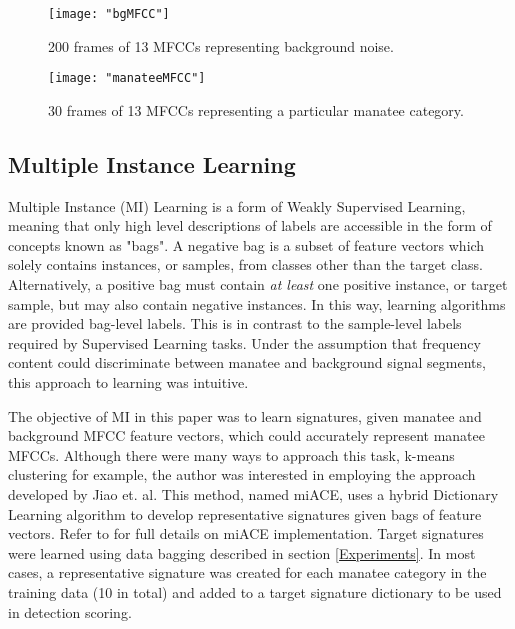 \documentclass[conference]{IEEEtran}
\begin{document}
\begin{center}
	\begin{figure*}[]
		\centering
		\texttt{[image: "bgMFCC"]}
		\caption{200 frames of 13 MFCCs representing background noise.}
		\label{fig:bgMFCC}
	\end{figure*}
\end{center}

\begin{center}
	\begin{figure*}[]
		\centering
		\texttt{[image: "manateeMFCC"]}
		\caption{30 frames of 13 MFCCs representing a particular manatee category.}
		\label{fig:manateeMFCC}
	\end{figure*}
\end{center}
	
	\vspace{-2.5cm}
	\subsection{Multiple Instance Learning}
	Multiple Instance (MI) Learning is a form of Weakly Supervised Learning, meaning that only high level descriptions of labels are accessible in the form of concepts known as "bags".  A negative bag is a subset of feature vectors which solely contains instances, or samples, from classes other than the target class.  Alternatively, a positive bag must contain \textit{at least} one positive instance, or target sample, but may also contain negative instances.    In this way, learning algorithms are provided bag-level labels.  This is in contrast to the sample-level labels required by Supervised Learning tasks.  Under the assumption that frequency content could discriminate between manatee and background signal segments, this approach to learning was intuitive.
	
	The objective of MI in this paper was to learn signatures, given manatee and background MFCC feature vectors, which could accurately represent manatee MFCCs.   Although there were many ways to approach this task, k-means clustering for example, the author was interested in employing the approach developed by Jiao et. al.  This method, named miACE, uses a hybrid Dictionary Learning algorithm to develop representative signatures given bags of feature vectors.  Refer to \cite{miACE} for full details on miACE implementation.  Target signatures were learned using data bagging described in section \ref{Experiments}.  In most cases, a representative signature was created for each manatee category in the training data (10 in total) and added to a target signature dictionary to be used in detection scoring.
\end{document}

